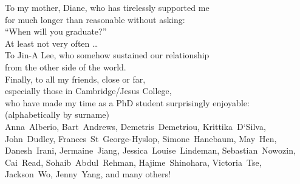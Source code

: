 
\begin{dedication}
To my mother, Diane, who has tirelessly supported me\\
for much longer than reasonable without asking:\\
``When will you graduate?''\\
At least not very often \ldots\\
\vspace{0.33\textheight minus 10ex}
To Jin-A Lee, who somehow sustained our relationship\\
from the other side of the world.\\
\vspace{0.11\textheight minus 10ex}
Finally, to all my friends, close or far,\\
especially those in Cambridge/Jesus College,\\
who have made my time as a PhD student surprisingly enjoyable:\\
\vspace{1em}
{\small(alphabetically by surname)}\\
\vspace{0.5em}
Anna~Alberio,
Bart~Andrews,
Demetris~Demetriou,
Krittika~D`Silva,
John~Dudley,
Frances~St~George-Hyslop,
Simone~Hanebaum,
May~Hen,
Danesh~Irani,
Jermaine~Jiang,
Jessica~Louise~Lindeman,
Sebastian~Nowozin,
Cai~Read,
Sohaib~Abdul~Rehman,
Hajime~Shinohara,
Victoria~Tse,
Jackson~Wo,
Jenny~Yang,
and many others!
\end{dedication}